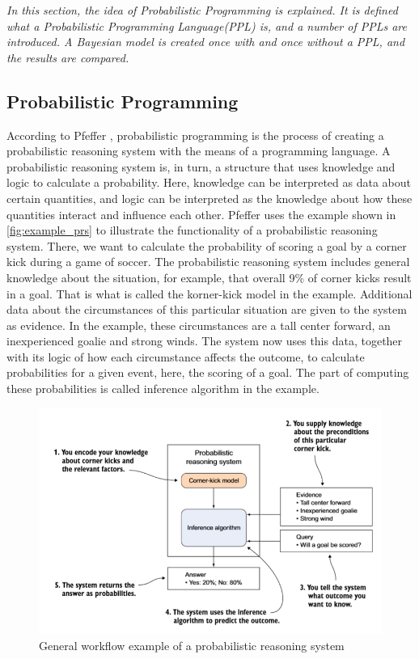 \documentclass{article}
\begin{document}
\textit{In this section, the idea of Probabilistic Programming is explained. It is defined what a Probabilistic Programming Language(PPL) is, and a number of PPLs are introduced. A Bayesian model is created once with and once without a PPL, and the results are compared.}

\subsection{Probabilistic Programming}
According to Pfeffer \cite{9781617292330}, probabilistic programming is the process of creating a probabilistic reasoning system with the means of a programming language. A probabilistic reasoning system is, in turn, a structure that uses knowledge and logic to calculate a probability. Here, knowledge can be interpreted as data about certain quantities, and logic can be interpreted as the knowledge about how these quantities interact and influence each other. Pfeffer \cite{9781617292330} uses the example shown in \autoref{fig:example_prs} to illustrate the functionality of a probabilistic reasoning system. There, we want to calculate the probability of scoring a goal by a corner kick during a game of soccer. The probabilistic reasoning system includes general knowledge about the situation, for example, that overall 9\% of corner kicks result in a goal. That is what is called the korner-kick model in the example. Additional data about the circumstances of this particular situation are given to the system as evidence. In the example, these circumstances are a tall center forward, an inexperienced goalie and strong winds. The system now uses this data, together with its logic of how each circumstance affects the outcome, to calculate probabilities for a given event, here, the scoring of a goal. The part of computing these probabilities is called inference algorithm in the example.
\begin{figure}
	\includegraphics[width=\textwidth]{images/probabilistic_reasoning_system.PNG}
	\caption[General workflow example of a probabilistic reasoning system. Source: \cite{9781617292330}]{General workflow example of a probabilistic reasoning system}
	\label{fig:example_prs}
\end{figure}
\end{document}
